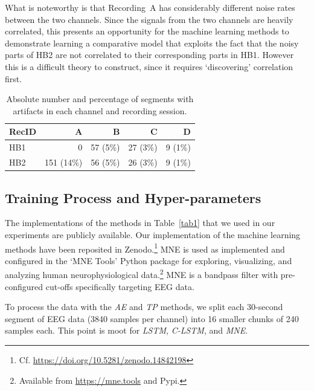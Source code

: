 \documentclass[runningheads]{llncs}
\begin{document}
What is noteworthy is that Recording~A has considerably different
noise rates between the two channels. Since the signals from the
two channels are heavily correlated, this presents an opportunity
for the machine learning methods to demonstrate learning a
comparative model that exploits the fact that the noisy parts of
HB2 are not correlated to their corresponding parts in HB1. However
this is a difficult theory to construct, since it requires
`discovering' correlation first.


\begin{table}[bt]
\caption{Absolute number and percentage of segments with artifacts in
  each channel and recording session.}
\centering
\renewcommand{\arraystretch}{1.3} %
\begin{tabular}{lrrrr}
\toprule
RecID &  A         &  B       &  C & D \\
\midrule
HB1   &   0        & 57 (5\%) & 27 (3\%) & 9 (1\%) \\

HB2   & 151 (14\%) & 56 (5\%) & 26 (3\%) & 9 (1\%) \\
\bottomrule
\end{tabular}
\label{tab2}
\end{table}



\subsection{Training Process and Hyper-parameters}

The implementations of the methods in Table~\ref{tab1} that we used in
our experiments are publicly available. Our implementation of the
machine learning methods have been reposited in Zenodo.\footnote{Cf. \url{https://doi.org/10.5281/zenodo.14842198}}
MNE is used as implemented and configured in the `MNE Tools' Python
package for exploring, visualizing, and analyzing human
neurophysiological data.\footnote{Available from \url{https://mne.tools} and Pypi.}
MNE is a bandpass filter with pre-configured cut-offs specifically
targeting EEG data.

To process the data with the \emph{AE} and \emph{TP} methods, we split
each 30-second segment of EEG data (3840 samples per channel) into 16
smaller chunks of 240 samples each. This point is moot for \emph{LSTM},
\emph{C-LSTM}, and \emph{MNE}.
\end{document}
